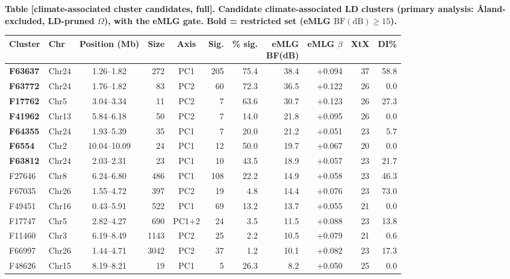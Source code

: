 \documentclass[border=12pt]{standalone}
\begin{document}
\begin{minipage}{18.5cm}
\raggedright
{\color{Accent}\bfseries Table [climate-associated cluster candidates, full]. Candidate climate-associated LD clusters (primary analysis: {\AA}land-excluded, LD-pruned $\Omega$), with the eMLG gate. Bold = restricted set (eMLG $\mathrm{BF(dB)}\geq 15$).}

\vspace{6pt}
\begin{center}\scriptsize
\begin{tabular}{@{}l l c r c r r r r r r@{}}
\toprule
Cluster & Chr & Position (Mb) & Size & Axis & Sig. & \% sig. & \makecell{eMLG\\BF(dB)} & \makecell{eMLG\\$\beta$} & XtX & DI\% \\
\midrule
\textbf{F63637} & Chr24 & 1.26--1.82 & 272 & PC1 & 205 & 75.4 & 38.4 & +0.094 & 37 & 58.8 \\
\textbf{F63772} & Chr24 & 1.76--1.82 & 83 & PC2 & 60 & 72.3 & 36.5 & +0.122 & 26 & 0.0 \\
\textbf{F17762} & Chr5 & 3.04--3.34 & 11 & PC2 & 7 & 63.6 & 30.7 & +0.123 & 26 & 27.3 \\
\textbf{F41962} & Chr13 & 5.84--6.18 & 50 & PC2 & 7 & 14.0 & 21.8 & +0.095 & 26 & 0.0 \\
\textbf{F64355} & Chr24 & 1.93--5.39 & 35 & PC1 & 7 & 20.0 & 21.2 & +0.051 & 23 & 5.7 \\
\textbf{F6554} & Chr2 & 10.04--10.09 & 24 & PC1 & 12 & 50.0 & 19.7 & +0.067 & 20 & 0.0 \\
\textbf{F63812} & Chr24 & 2.03--2.31 & 23 & PC1 & 10 & 43.5 & 18.9 & +0.057 & 23 & 21.7 \\
\midrule
F27646 & Chr8 & 6.24--6.80 & 486 & PC1 & 108 & 22.2 & 14.9 & +0.058 & 23 & 46.3 \\
F67035 & Chr26 & 1.55--4.72 & 397 & PC2 & 19 & 4.8 & 14.4 & +0.076 & 23 & 73.0 \\
F49451 & Chr16 & 0.43--5.91 & 522 & PC1 & 69 & 13.2 & 13.7 & +0.055 & 21 & 0.0 \\
F17747 & Chr5 & 2.82--4.27 & 690 & PC1+2 & 24 & 3.5 & 11.5 & +0.088 & 23 & 13.8 \\
F11460 & Chr3 & 6.19--8.49 & 1143 & PC2 & 25 & 2.2 & 10.5 & +0.079 & 21 & 0.6 \\
F66997 & Chr26 & 1.44--4.71 & 3042 & PC2 & 37 & 1.2 & 10.1 & +0.082 & 23 & 17.3 \\
F48626 & Chr15 & 8.19--8.21 & 19 & PC1 & 5 & 26.3 & 8.2 & +0.050 & 25 & 0.0 \\

\end{tabular}
\end{center}
\end{minipage}
\end{document}
